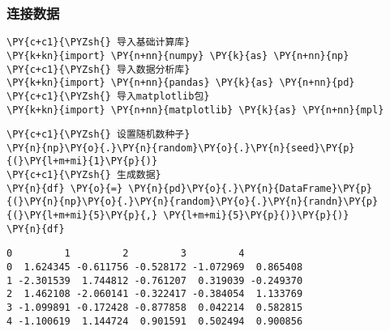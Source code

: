     \hypertarget{ux8fdeux63a5ux6570ux636e}{%
\subsubsection{连接数据}\label{ux8fdeux63a5ux6570ux636e}}

    \begin{tcolorbox}[breakable, size=fbox, boxrule=1pt, pad at break*=1mm,colback=cellbackground, colframe=cellborder]
\begin{Verbatim}[commandchars=\\\{\}]
\PY{c+c1}{\PYZsh{} 导入基础计算库}
\PY{k+kn}{import} \PY{n+nn}{numpy} \PY{k}{as} \PY{n+nn}{np}
\PY{c+c1}{\PYZsh{} 导入数据分析库}
\PY{k+kn}{import} \PY{n+nn}{pandas} \PY{k}{as} \PY{n+nn}{pd}
\PY{c+c1}{\PYZsh{} 导入matplotlib包}
\PY{k+kn}{import} \PY{n+nn}{matplotlib} \PY{k}{as} \PY{n+nn}{mpl}
\end{Verbatim}
\end{tcolorbox}

    \begin{tcolorbox}[breakable, size=fbox, boxrule=1pt, pad at break*=1mm,colback=cellbackground, colframe=cellborder]
\begin{Verbatim}[commandchars=\\\{\}]
\PY{c+c1}{\PYZsh{} 设置随机数种子}
\PY{n}{np}\PY{o}{.}\PY{n}{random}\PY{o}{.}\PY{n}{seed}\PY{p}{(}\PY{l+m+mi}{1}\PY{p}{)}
\PY{c+c1}{\PYZsh{} 生成数据}
\PY{n}{df} \PY{o}{=} \PY{n}{pd}\PY{o}{.}\PY{n}{DataFrame}\PY{p}{(}\PY{n}{np}\PY{o}{.}\PY{n}{random}\PY{o}{.}\PY{n}{randn}\PY{p}{(}\PY{l+m+mi}{5}\PY{p}{,} \PY{l+m+mi}{5}\PY{p}{)}\PY{p}{)}
\PY{n}{df}
\end{Verbatim}
\end{tcolorbox}

            \begin{tcolorbox}[breakable, size=fbox, boxrule=.5pt, pad at break*=1mm, opacityfill=0]
\begin{Verbatim}[commandchars=\\\{\}]
          0         1         2         3         4
0  1.624345 -0.611756 -0.528172 -1.072969  0.865408
1 -2.301539  1.744812 -0.761207  0.319039 -0.249370
2  1.462108 -2.060141 -0.322417 -0.384054  1.133769
3 -1.099891 -0.172428 -0.877858  0.042214  0.582815
4 -1.100619  1.144724  0.901591  0.502494  0.900856
\end{Verbatim}
\end{tcolorbox}
        
